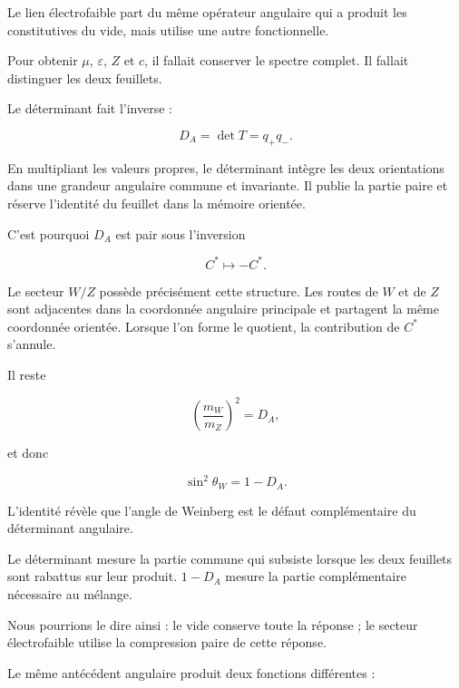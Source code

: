 Le lien électrofaible part du même opérateur angulaire qui a produit les constitutives du vide, mais utilise une autre fonctionnelle.\par

Pour obtenir \(\mu\), \(\varepsilon\), \(Z\) et \(c\), il fallait conserver le spectre complet. Il fallait distinguer les deux feuillets.\par

Le déterminant fait l’inverse :\par

\[
D_A=\det T=q_+q_-.
\]

En multipliant les valeurs propres, le déterminant intègre les deux orientations dans une grandeur angulaire commune et invariante. Il publie la partie paire et réserve l’identité du feuillet dans la mémoire orientée.\par

C’est pourquoi \(D_A\) est pair sous l’inversion\par

\[
C^*\longmapsto-C^*.
\]

Le secteur \(W/Z\) possède précisément cette structure. Les routes de \(W\) et de \(Z\) sont adjacentes dans la coordonnée angulaire principale et partagent la même coordonnée orientée. Lorsque l’on forme le quotient, la contribution de \(C^*\) s’annule.\par

Il reste\par

\[
\left(\frac{m_W}{m_Z}\right)^2
=
D_A,
\]

et donc\par

\[
\sin^2\theta_W
=
1-D_A.
\]

L’identité révèle que l’angle de Weinberg est le défaut complémentaire du déterminant angulaire.\par

Le déterminant mesure la partie commune qui subsiste lorsque les deux feuillets sont rabattus sur leur produit. \(1-D_A\) mesure la partie complémentaire nécessaire au mélange.\par

Nous pourrions le dire ainsi : le vide conserve toute la réponse ; le secteur électrofaible utilise la compression paire de cette réponse.\par

Le même antécédent angulaire produit deux fonctions différentes :\par

